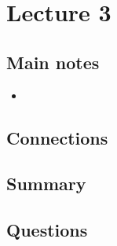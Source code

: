 \section{Lecture 3}

\subsection{Main notes}


\begin{itemize}
	\item
\end{itemize}


\subsection{Connections}


\subsection{Summary}


\subsection{Questions}
